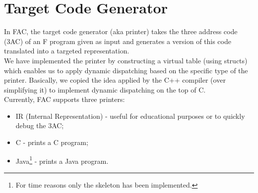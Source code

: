 \section{Target Code Generator}

In FAC, the target code generator (aka printer) takes the
three address code (3AC) of an F program given as input and generates a version
of this code translated into a targeted representation.
\\
We have implemented the printer by constructing a virtual table
(using structs) which enables us to apply dynamic dispatching based on the
specific type of the printer. Basically, we copied the idea applied by the C++
compiler (over simplifying it) to implement dynamic dispatching on the top of C.
\\
Currently, FAC supports three printers:
\begin{itemize}
\item IR (Internal Representation) - useful for educational purposes or to
quickly debug the 3AC;
\item C - prints a C program;
\item Java\footnote{For time reasons only the skeleton has been implemented.}
- prints a Java program.
\end{itemize}